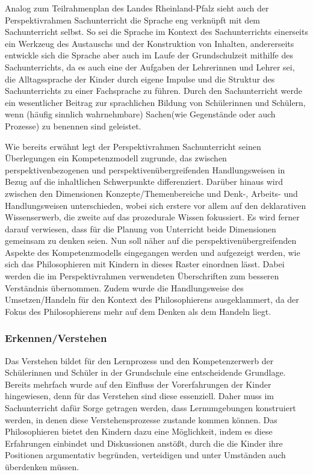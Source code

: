 Analog zum Teilrahmenplan des Landes Rheinland-Pfalz sieht auch der Perspektivrahmen Sachunterricht die Sprache eng verknüpft mit dem Sachunterricht selbst. 
So sei die Sprache im Kontext des Sachunterrichts einerseits ein Werkzeug des Austauschs und der Konstruktion von Inhalten, andererseits entwickle sich die Sprache aber auch im Laufe der Grundschulzeit mithilfe des Sachunterrichts, da es auch eine der Aufgaben der Lehrerinnen und Lehrer sei, die Alltagssprache der Kinder durch eigene Impulse und die Struktur des Sachunterrichts zu einer Fachsprache zu führen. 
Durch den Sachunterricht werde ein wesentlicher \glqq Beitrag zur sprachlichen Bildung von Schülerinnen und Schülern, wenn (häufig sinnlich wahrnehmbare) \glqq Sachen\grqq (wie Gegenstände oder auch Prozesse) zu benennen sind\grqq{} \cite[S.\,11]{GDS13} geleistet.

Wie bereits erwähnt legt der Perspektivrahmen Sachunterricht seinen Überlegungen ein Kompetenzmodell zugrunde, das zwischen perspektivenbezogenen und perspektivenübergreifenden Handlungsweisen in Bezug auf die inhaltlichen Schwerpunkte differenziert.
 Darüber hinaus wird zwischen den Dimensionen \glqq Konzepte/Themenbereiche\grqq{} und \glqq Denk-, Arbeits- und Handlungsweisen\grqq{} unterschieden, wobei sich erstere vor allem auf den deklarativen Wissenserwerb, die zweite auf das prozedurale Wissen fokussiert. 
 Es wird ferner darauf verwiesen, dass für die Planung von Unterricht beide Dimensionen gemeinsam zu denken seien.
 Nun soll näher auf die perspektivenübergreifenden Aspekte des Kompetenzmodells eingegangen werden und aufgezeigt werden, wie sich das Philosophieren mit Kindern in dieses Raster einordnen lässt. 
 Dabei werden die im Perspektivrahmen verwendeten Überschriften zum besseren Verständnis übernommen. 
Zudem wurde die Handlungsweise des Umsetzen/Handeln für den Kontext des Philosophierens ausgeklammert, da der Fokus des Philosophierens mehr auf dem Denken als dem Handeln liegt.

\newpage

\subsubsection{Erkennen/Verstehen}


Das Verstehen bildet für den Lernprozess und den Kompetenzerwerb der Schülerinnen und Schüler in der Grundschule eine entscheidende Grundlage. 
Bereits mehrfach wurde auf den Einfluss der Vorerfahrungen der Kinder hingewiesen, denn für das Verstehen sind diese essenziell. 
Daher muss im Sachunterricht dafür Sorge getragen werden, dass Lernumgebungen konstruiert werden, in denen diese Verstehensprozesse zustande kommen können. 
Das Philosophieren bietet den Kindern dazu eine Möglichkeit, indem es diese Erfahrungen einbindet und Diskussionen anstößt, durch die die Kinder ihre Positionen argumentativ begründen, verteidigen und unter Umständen auch überdenken müssen. 

